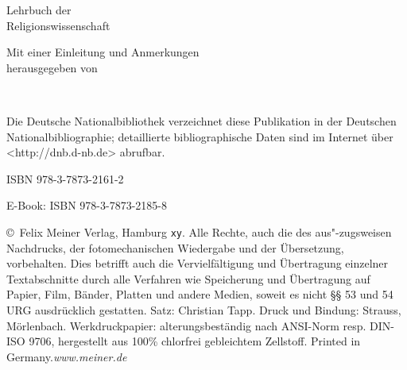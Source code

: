 \pagestyle{completelyempty}%
\cleardoublepage
\begin{center}
\newlength{\titeldehnung}\setlength{\titeldehnung}{0.8ex}
\def\sperrfaktor{1.2}
\par\vspace{12mm}
\LARGE Lehrbuch der \\
Religionswissenschaft \par\vspace{12mm}
\normalsize Mit einer Einleitung und Anmerkungen \\[\titeldehnung]
herausgegeben von \\[\titeldehnung]
\par\vfill
{}\\[\titeldehnung]
\par
\end{center}
\newpage
\begin{center}
\par\vfill
\end{center}
\footnotesize\mbox{}\par
\begin{minipage}{77mm}
\noindent Die Deutsche Nationalbibliothek verzeichnet diese Publikation in der Deutschen Nationalbibliographie; detaillierte bibliographische Daten sind im Internet über <http://dnb.d-nb.de> abrufbar.\par
ISBN 978-3-7873-2161-2\par
E-Book: ISBN 978-3-7873-2185-8\par\vspace{12mm}
\copyright\ Felix Meiner Verlag, Hamburg \texttt{xy}. Alle Rechte, auch die des aus"-zugsweisen Nachdrucks, der fotomechanischen Wiedergabe und der Übersetzung, vorbehalten. Dies betrifft auch die Vervielfältigung und Übertragung einzelner Textabschnitte durch alle Verfahren wie Speicherung und Übertragung auf Papier, Film, Bänder, Platten und andere Medien, soweit es nicht §§ 53 und 54 URG ausdrücklich gestatten. Satz: Christian Tapp. Druck und Bindung: Strauss, Mörlenbach. Werkdruckpapier: alterungsbeständig nach ANSI-Norm resp. DIN-ISO 9706, hergestellt aus 100\% chlorfrei gebleichtem Zellstoff. Printed in Germany.\hfill \textit{www.meiner.de}\par
\end{minipage}
\newpage
\endinput